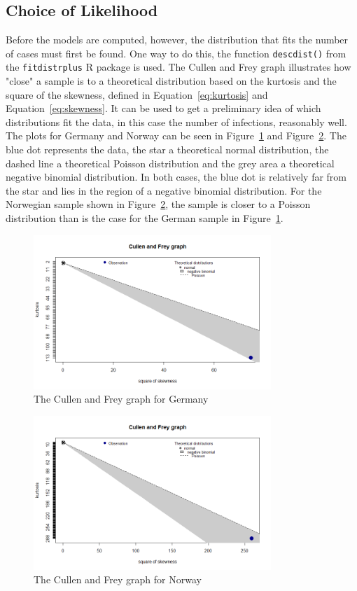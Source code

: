 \subsection{Choice of Likelihood}\label{sec:likelihood}
Before the models are computed, however, the distribution that fits the number of cases must first be found. One way to do this, the function \texttt{descdist()} from the \texttt{fitdistrplus} R package is used. The Cullen and Frey graph illustrates how "close" a sample is to a theoretical distribution based on the kurtosis and the square of the skewness, defined in Equation~\ref{eq:kurtosis} and Equation~\ref{eq:skewness}. It can be used to get a preliminary idea of which distributions fit the data, in this case the number of infections, reasonably well. \\
The plots for Germany and Norway can be seen in Figure~\ref{cf_germany} and Figure~\ref{cf_norway}. The blue dot represents the data, the star a theoretical normal distribution, the dashed line a theoretical Poisson distribution and the grey area a theoretical negative binomial distribution. In both cases, the blue dot is relatively far from the star and lies in the region of a negative binomial distribution. For the Norwegian sample shown in Figure~\ref{cf_norway}, the sample is closer to a Poisson distribution than is the case for the German sample in Figure~\ref{cf_germany}.
\begin{figure}[H]
  \centering
  \includegraphics[width = 0.8\textwidth]{cf_germany.png}
  \caption{The Cullen and Frey graph for Germany}
  \label{cf_germany}
\end{figure}
\begin{figure}[H]
  \centering
  \includegraphics[width = 0.8\textwidth]{cf_norway.png}
  \caption{The Cullen and Frey graph for Norway}
  \label{cf_norway}
\end{figure}
